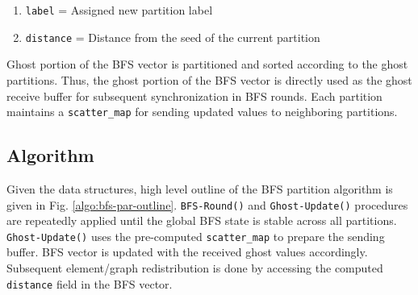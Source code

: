 \documentclass[conference]{IEEEtran}
\begin{document}
\begin{enumerate}
    \item \verb|label| = Assigned new partition label
    \item \verb|distance| = Distance from the seed of the current partition
\end{enumerate}
Ghost portion of the BFS vector is partitioned and sorted according to the ghost partitions. Thus, the ghost portion of the BFS vector is directly used as the ghost receive buffer for subsequent synchronization in BFS rounds. Each partition maintains a \verb|scatter_map| for sending updated values to neighboring partitions. 


\subsection{Algorithm}
Given the data structures, high level outline of the BFS partition algorithm is given in Fig. \ref{algo:bfs-par-outline}. \verb|BFS-Round()| and \verb|Ghost-Update()| procedures are repeatedly applied until the global BFS state is stable across all partitions. \verb|Ghost-Update()| uses the pre-computed \verb|scatter_map| to prepare the sending buffer. BFS vector is updated with the received ghost values accordingly. Subsequent element/graph redistribution is done by accessing the computed \verb|distance| field in the BFS vector.
\end{document}
